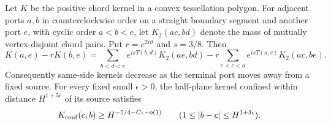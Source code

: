 \begin{lemma}
\label{R:signed:two-source}
Let $K$ be the positive chord kernel in a convex tessellation polygon.
For adjacent ports $a,b$ in counterclockwise order on a straight boundary
segment and another port $e$, with cyclic order $a<b<e$, let
$K_2(ac,bd)$ denote the mass of mutually vertex-disjoint chord pairs.
Put $r=e^{2i\vartheta}$ and $s=3/8$. Then
\begin{equation}\label{R:alt:j:eq-br4}
K(a,e)-rK(b,e)
 =\sum_{b<d<e}e^{isT(b,d)}K_2(ae,bd)
 -r\sum_{e<c<a}e^{isT(a,c)}K_2(ac,be).
\end{equation}
Consequently same-side kernels decrease as the terminal port moves away
from a fixed source. For every fixed small $\epsilon>0$, the half-plane
kernel confined within distance $H^{1+5\epsilon}$ of its source satisfies
\begin{equation}\label{R:alt:j:eq-br5}
K_{\rm conf}(c,b)\ge H^{-5/4-C\epsilon-o(1)}
\qquad(1\le |b-c|\le H^{1+3\epsilon}).
\end{equation}
\end{lemma}
